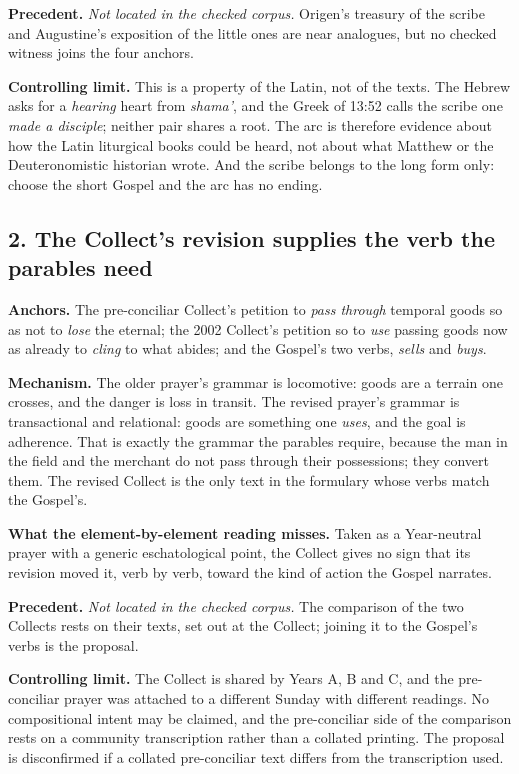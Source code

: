 \textbf{Precedent.} \emph{Not located in the checked corpus.} Origen's treasury of the scribe and Augustine's exposition of the little ones are near analogues, but no checked witness joins the four anchors.

\textbf{Controlling limit.} This is a property of the Latin, not of the texts. The Hebrew asks for a \emph{hearing} heart from \emph{shama'}, and the Greek of 13:52 calls the scribe one \emph{made a disciple}; neither pair shares a root. The arc is therefore evidence about how the Latin liturgical books could be heard, not about what Matthew or the Deuteronomistic historian wrote. And the scribe belongs to the long form only: choose the short Gospel and the arc has no ending.

\subsection*{2. The Collect's revision supplies the verb the parables need}

\textbf{Anchors.} The pre-conciliar Collect's petition to \emph{pass through} temporal goods so as not to \emph{lose} the eternal; the 2002 Collect's petition so to \emph{use} passing goods now as already to \emph{cling} to what abides; and the Gospel's two verbs, \emph{sells} and \emph{buys}.

\textbf{Mechanism.} The older prayer's grammar is locomotive: goods are a terrain one crosses, and the danger is loss in transit. The revised prayer's grammar is transactional and relational: goods are something one \emph{uses}, and the goal is adherence. That is exactly the grammar the parables require, because the man in the field and the merchant do not pass through their possessions; they convert them. The revised Collect is the only text in the formulary whose verbs match the Gospel's.

\textbf{What the element-by-element reading misses.} Taken as a Year-neutral prayer with a generic eschatological point, the Collect gives no sign that its revision moved it, verb by verb, toward the kind of action the Gospel narrates.

\textbf{Precedent.} \emph{Not located in the checked corpus.} The comparison of the two Collects rests on their texts, set out at the Collect; joining it to the Gospel's verbs is the proposal.

\textbf{Controlling limit.} The Collect is shared by Years A, B and C, and the pre-conciliar prayer was attached to a different Sunday with different readings. No compositional intent may be claimed, and the pre-conciliar side of the comparison rests on a community transcription rather than a collated printing. The proposal is disconfirmed if a collated pre-conciliar text differs from the transcription used.

